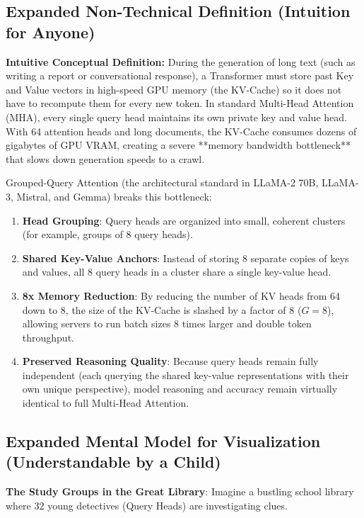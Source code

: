 \documentclass[11pt,a4paper]{article}
\theoremstyle{definition}
\begin{document}
\subsection{Expanded Non-Technical Definition (Intuition for Anyone)}
\textbf{Intuitive Conceptual Definition:}
During the generation of long text (such as writing a report or conversational response), a Transformer must store past Key and Value vectors in high-speed GPU memory (the KV-Cache) so it does not have to recompute them for every new token.
In standard Multi-Head Attention (MHA), every single query head maintains its own private key and value head. With 64 attention heads and long documents, the KV-Cache consumes dozens of gigabytes of GPU VRAM, creating a severe **memory bandwidth bottleneck** that slows down generation speeds to a crawl.

Grouped-Query Attention (the architectural standard in LLaMA-2 70B, LLaMA-3, Mistral, and Gemma) breaks this bottleneck:
\begin{enumerate}
    \item \textbf{Head Grouping}: Query heads are organized into small, coherent clusters (for example, groups of 8 query heads).
    \item \textbf{Shared Key-Value Anchors}: Instead of storing 8 separate copies of keys and values, all 8 query heads in a cluster share a single key-value head.
    \item \textbf{8x Memory Reduction}: By reducing the number of KV heads from 64 down to 8, the size of the KV-Cache is slashed by a factor of 8 ($G = 8$), allowing servers to run batch sizes 8 times larger and double token throughput.
    \item \textbf{Preserved Reasoning Quality}: Because query heads remain fully independent (each querying the shared key-value representations with their own unique perspective), model reasoning and accuracy remain virtually identical to full Multi-Head Attention.
\end{enumerate}

\subsection{Expanded Mental Model for Visualization (Understandable by a Child)}
\textbf{The Study Groups in the Great Library}:
Imagine a bustling school library where 32 young detectives (Query Heads) are investigating clues.
\end{document}
